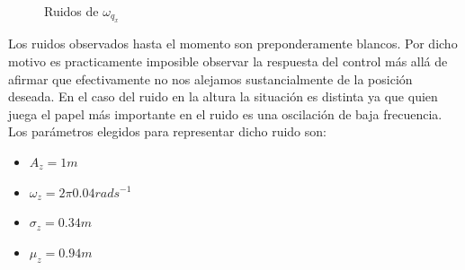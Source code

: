 \documentclass[main]{subfiles}
\begin{document}
\begin{figure}[h!]
  \centering
  \caption{Ruidos de $\omega_{q_x}$}
  \label{fig:ruidos_wqx}
\end{figure}


Los ruidos observados hasta el momento son preponderamente blancos. Por dicho motivo es practicamente imposible observar la respuesta del control m\'as all\'a de afirmar que efectivamente no nos alejamos sustancialmente de la posici\'on deseada. En el caso del ruido en la altura la situaci\'on es distinta ya que quien juega el papel m\'as importante en el ruido es una oscilaci\'on de baja frecuencia. Los par\'ametros elegidos para representar dicho ruido son:

\begin{itemize}
\item $A_z = 1 m$
\item $\omega_{z} = 2\pi 0.04 rad s^{-1}$
\item $\sigma_{z} = 0.34 m$
\item $\mu_{z} = 0.94 m$
\end{itemize}
\end{document}
